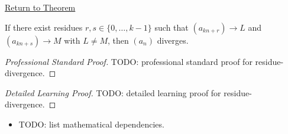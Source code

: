 \newpage
{}
\label{prf:residue-divergence}

\begin{remark*}[Return]
\hyperref[prop:residue-divergence]{Return to Theorem}
\end{remark*}

\begin{theorem*}
If there exist residues $r, s \in \{0,\ldots,k-1\}$ such that
$(a_{kn+r}) \to L$ and $(a_{kn+s}) \to M$ with $L \neq M$, then
$(a_n)$ diverges.
\end{theorem*}

\begin{proof}[Professional Standard Proof]
\LRAProofBodyStart
TODO: professional standard proof for residue-divergence.
\end{proof}

\begin{proof}[Detailed Learning Proof]
\LRAProofBodyStart
TODO: detailed learning proof for residue-divergence.
\end{proof}

\begin{remark*}
\end{remark*}

\begin{dependencies}
\begin{itemize}
  \item TODO: list mathematical dependencies.
\end{itemize}
\end{dependencies}

\clearpage
